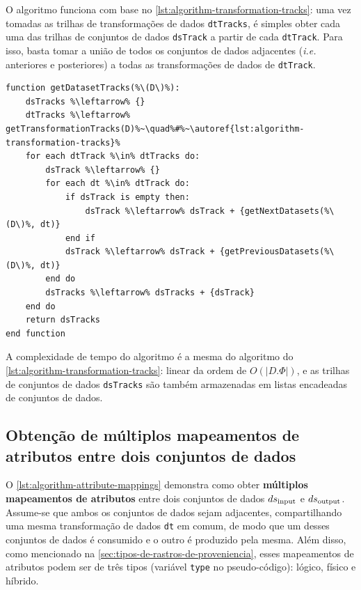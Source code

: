 O algoritmo funciona com base no \autoref{lst:algorithm-transformation-tracks}: uma vez tomadas as trilhas de transformações de dados \texttt{dtTracks}, é simples obter cada uma das trilhas de conjuntos de dados \texttt{dsTrack} a partir de cada \texttt{dtTrack}. Para isso, basta tomar a união de todos os conjuntos de dados adjacentes (\textit{i.e.} anteriores e posteriores) a todas as transformações de dados de \texttt{dtTrack}.

\begin{minipage}[c]{0.95\textwidth}
\begin{lstlisting}[language=pseudocode,label={lst:algorithm-dataset-tracks},caption={[Detecção das trilhas de conjuntos de dados]Detecção do rastro do fluxo de dados no nível de trilhas de conjuntos de dados.}]
function getDatasetTracks(%\(D\)%):
    dsTracks %\leftarrow% {}
    dtTracks %\leftarrow% getTransformationTracks(D)%~\quad%#%~\autoref{lst:algorithm-transformation-tracks}%
    for each dtTrack %\in% dtTracks do:
        dsTrack %\leftarrow% {}
        for each dt %\in% dtTrack do:
            if dsTrack is empty then:
                dsTrack %\leftarrow% dsTrack + {getNextDatasets(%\(D\)%, dt)}
            end if
            dsTrack %\leftarrow% dsTrack + {getPreviousDatasets(%\(D\)%, dt)}
        end do
        dsTracks %\leftarrow% dsTracks + {dsTrack}
    end do
    return dsTracks
end function
\end{lstlisting}
\end{minipage}

A complexidade de tempo do algoritmo é a mesma do algoritmo do \autoref{lst:algorithm-transformation-tracks}: linear da ordem de \( O(|D.\Phi|) \), e as trilhas de conjuntos de dados \texttt{dsTracks} são também armazenadas em listas encadeadas de conjuntos de dados.

\subsection{Obtenção de múltiplos mapeamentos de atributos entre dois conjuntos de dados}

O \autoref{lst:algorithm-attribute-mappings} demonstra como obter \textbf{múltiplos mapeamentos de atributos} entre dois conjuntos de dados \(ds_{\textup{input}}\) e \(ds_{\textup{output}}\). Assume-se que ambos os conjuntos de dados sejam adjacentes, compartilhando uma mesma transformação de dados \texttt{dt} em comum, de modo que um desses conjuntos de dados é consumido e o outro é produzido pela mesma. Além disso, como mencionado na \autoref{sec:tipos-de-rastros-de-proveniencia}, esses mapeamentos de atributos podem ser de três tipos (variável \texttt{type} no pseudo-código): lógico, físico e híbrido.

